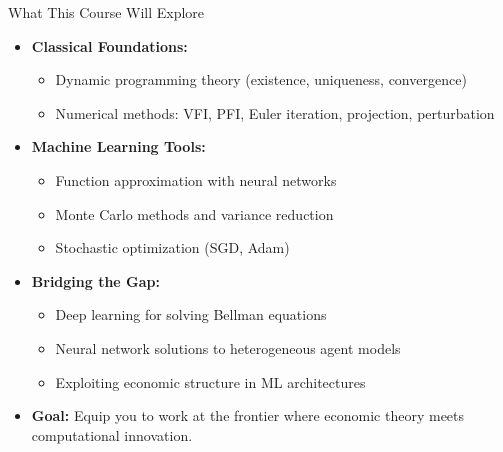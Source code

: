\documentclass[10pt,english,aspectratio=169]{beamer}
\begin{document}
\begin{frame}{What This Course Will Explore}
\begin{itemize}
\item \textbf{Classical Foundations:}
\begin{itemize}
    \item Dynamic programming theory (existence, uniqueness, convergence)
    \item Numerical methods: VFI, PFI, Euler iteration, projection, perturbation
\end{itemize}

\medskip
\item \textbf{Machine Learning Tools:}
\begin{itemize}
    \item Function approximation with neural networks
    \item Monte Carlo methods and variance reduction
    \item Stochastic optimization (SGD, Adam)
\end{itemize}

\medskip
\item \textbf{Bridging the Gap:}
\begin{itemize}
    \item Deep learning for solving Bellman equations
    \item Neural network solutions to heterogeneous agent models
    \item Exploiting economic structure in ML architectures
\end{itemize}

\medskip
\item \textbf{Goal:} Equip you to work at the frontier where economic theory meets computational innovation.
\end{itemize}
\end{frame}
\end{document}
